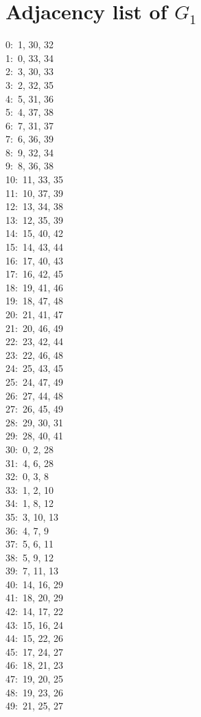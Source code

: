 \documentclass[11pt]{article}
\theoremstyle{remark}\newtheorem{remark}[theorem]{Remark}
\begin{document}
\section{Adjacency list of $G_1$}
\noindent\small
0:\ 1, 30, 32\\
1:\ 0, 33, 34\\
2:\ 3, 30, 33\\
3:\ 2, 32, 35\\
4:\ 5, 31, 36\\
5:\ 4, 37, 38\\
6:\ 7, 31, 37\\
7:\ 6, 36, 39\\
8:\ 9, 32, 34\\
9:\ 8, 36, 38\\
10:\ 11, 33, 35\\
11:\ 10, 37, 39\\
12:\ 13, 34, 38\\
13:\ 12, 35, 39\\
14:\ 15, 40, 42\\
15:\ 14, 43, 44\\
16:\ 17, 40, 43\\
17:\ 16, 42, 45\\
18:\ 19, 41, 46\\
19:\ 18, 47, 48\\
20:\ 21, 41, 47\\
21:\ 20, 46, 49\\
22:\ 23, 42, 44\\
23:\ 22, 46, 48\\
24:\ 25, 43, 45\\
25:\ 24, 47, 49\\
26:\ 27, 44, 48\\
27:\ 26, 45, 49\\
28:\ 29, 30, 31\\
29:\ 28, 40, 41\\
30:\ 0, 2, 28\\
31:\ 4, 6, 28\\
32:\ 0, 3, 8\\
33:\ 1, 2, 10\\
34:\ 1, 8, 12\\
35:\ 3, 10, 13\\
36:\ 4, 7, 9\\
37:\ 5, 6, 11\\
38:\ 5, 9, 12\\
39:\ 7, 11, 13\\
40:\ 14, 16, 29\\
41:\ 18, 20, 29\\
42:\ 14, 17, 22\\
43:\ 15, 16, 24\\
44:\ 15, 22, 26\\
45:\ 17, 24, 27\\
46:\ 18, 21, 23\\
47:\ 19, 20, 25\\
48:\ 19, 23, 26\\
49:\ 21, 25, 27\\
\normalsize
\end{document}
